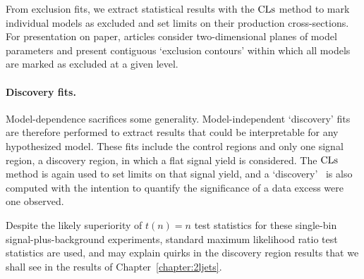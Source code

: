 From exclusion fits, we extract statistical results with the $\mathrm{CLs}$ method to
mark individual models as excluded and set limits on their production
cross-sections.
For presentation on paper, articles consider two-dimensional planes of model
parameters and present contiguous `exclusion contours' within which all models
are marked as excluded at a given level.

\paragraph{Discovery fits.}
Model-dependence sacrifices some generality.
Model-independent `discovery' fits are therefore performed to extract results
that could be interpretable for any hypothesized model.
These fits include the control regions and only one signal region, a
discovery region, in which a flat signal yield is considered.
The $\mathrm{CLs}$ method is again used to set limits on that signal yield,
and a `discovery' \pvalue\ is also computed with the intention to quantify
the significance of a data excess were one observed.

Despite the likely superiority of $t(n) = n$ test statistics for these
single-bin signal-plus-background experiments, standard maximum likelihood
ratio test statistics are used, and may explain quirks in the discovery
region results that we shall see in the results of
Chapter~\ref{chapter:2ljets}.

